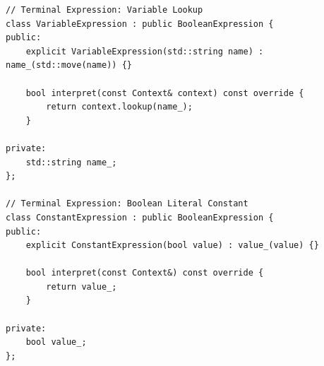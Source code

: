 \documentclass[12pt,a4paper]{article}
\begin{document}
\begin{lstlisting}[caption=Terminal Expressions: Variables and Constants]
// Terminal Expression: Variable Lookup
class VariableExpression : public BooleanExpression {
public:
    explicit VariableExpression(std::string name) : name_(std::move(name)) {}

    bool interpret(const Context& context) const override {
        return context.lookup(name_);
    }

private:
    std::string name_;
};

// Terminal Expression: Boolean Literal Constant
class ConstantExpression : public BooleanExpression {
public:
    explicit ConstantExpression(bool value) : value_(value) {}

    bool interpret(const Context&) const override {
        return value_;
    }

private:
    bool value_;
};
\end{lstlisting}
\end{document}
